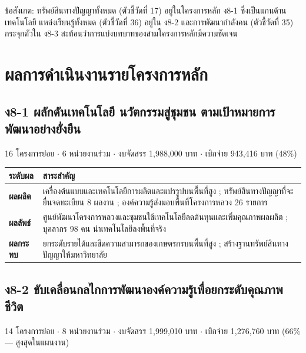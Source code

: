 \documentclass[12pt,a4paper]{article}
\begin{document}
ข้อสังเกต: ทรัพย์สินทางปัญญาทั้งหมด (ตัวชี้วัดที่ 17) อยู่ในโครงการหลัก ง8-1 ซึ่งเป็นแกนด้านเทคโนโลยี
แหล่งเรียนรู้ทั้งหมด (ตัวชี้วัดที่ 36) อยู่ใน ง8-2 และการพัฒนากำลังคน (ตัวชี้วัดที่ 35) กระจุกตัวใน ง8-3
สะท้อนว่าการแบ่งบทบาทของสามโครงการหลักมีความชัดเจน

\clearpage
\section{ผลการดำเนินงานรายโครงการหลัก}

\subsection{ง8-1 ผลักดันเทคโนโลยี นวัตกรรมสู่ชุมชน ตามเป้าหมายการพัฒนาอย่างยั่งยืน}
16 โครงการย่อย $\cdot$ 6 หน่วยงานร่วม $\cdot$ งบจัดสรร 1,988,000 บาท $\cdot$ เบิกจ่าย 943,416 บาท (48\%)

\begin{center}\small
\setlength{\tabcolsep}{6pt}\renewcommand{\arraystretch}{1.3}
\begin{tabular}{p{2.5cm}p{12.2cm}}
\toprule
\rowcolor{rpfnavy!12}\textbf{ระดับผล} & \textbf{สาระสำคัญ}\\
\midrule
\textbf{ผลผลิต} & เครื่องต้นแบบและเทคโนโลยีการผลิตและแปรรูปบนพื้นที่สูง ; ทรัพย์สินทางปัญญาที่จะยื่นจดทะเบียน 8 ผลงาน ; องค์ความรู้ส่งมอบพื้นที่โครงการหลวง 26 รายการ\\
\textbf{ผลลัพธ์} & ศูนย์พัฒนาโครงการหลวงและชุมชนใช้เทคโนโลยีลดต้นทุนและเพิ่มคุณภาพผลผลิต ; บุคลากร 98 คน นำเทคโนโลยีลงพื้นที่จริง\\
\textbf{ผลกระทบ} & ยกระดับรายได้และขีดความสามารถของเกษตรกรบนพื้นที่สูง ; สร้างฐานทรัพย์สินทางปัญญาให้มหาวิทยาลัย\\
\bottomrule
\end{tabular}
\end{center}

\subsection{ง8-2 ขับเคลื่อนกลไกการพัฒนาองค์ความรู้เพื่อยกระดับคุณภาพชีวิต}
14 โครงการย่อย $\cdot$ 8 หน่วยงานร่วม $\cdot$ งบจัดสรร 1,999,010 บาท $\cdot$ เบิกจ่าย 1,276,760 บาท (66\% --- สูงสุดในแผนงาน)
\end{document}
